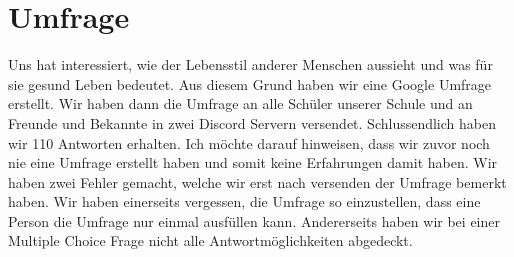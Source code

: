 \chapter{Umfrage}
\authortoc{\dario}{\chapterident}
Uns hat interessiert, wie der Lebensstil anderer Menschen aussieht und was für sie gesund Leben bedeutet. Aus diesem Grund haben wir eine Google Umfrage erstellt. Wir haben dann die Umfrage an alle Schüler unserer Schule und an Freunde und Bekannte in zwei Discord Servern versendet. Schlussendlich haben wir 110 Antworten erhalten.
\newline
Ich möchte darauf hinweisen, dass wir zuvor noch nie eine Umfrage erstellt haben und somit keine Erfahrungen damit haben. Wir haben zwei Fehler gemacht, welche wir erst nach versenden der Umfrage bemerkt haben. Wir haben einerseits vergessen, die Umfrage so einzustellen, dass eine Person die Umfrage nur einmal ausfüllen kann. Andererseits haben wir bei einer Multiple Choice Frage nicht alle Antwortmöglichkeiten abgedeckt.
